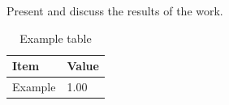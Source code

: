 Present and discuss the results of the work.

\begin{table}[H]
  \centering
  \caption{Example table}
  \label{tab:example}
  \begin{tabular}{ll}
    \toprule
    Item & Value \\
    \midrule
    Example & 1.00 \\
    \bottomrule
  \end{tabular}
\end{table}
